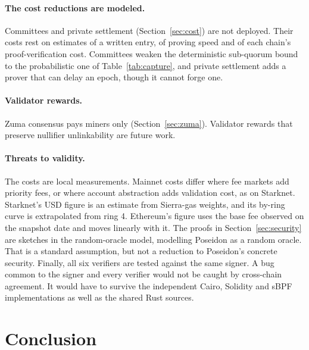 \documentclass[11pt]{article}
\theoremstyle{remark}
\begin{document}
\paragraph{The cost reductions are modeled.} Committees and private settlement (Section~\ref{sec:cost}) are not deployed. Their costs rest on estimates of a written entry, of proving speed and of each chain's proof-verification cost. Committees weaken the deterministic sub-quorum bound to the probabilistic one of Table~\ref{tab:capture}, and private settlement adds a prover that can delay an epoch, though it cannot forge one.

\paragraph{Validator rewards.} Zuma consensus pays miners only (Section~\ref{sec:zuma}). Validator rewards that preserve nullifier unlinkability are future work.

\paragraph{Threats to validity.} The costs are local measurements. Mainnet costs differ where fee markets add priority fees, or where account abstraction adds validation cost, as on Starknet. Starknet's USD figure is an estimate from Sierra-gas weights, and its by-ring curve is extrapolated from ring 4. Ethereum's figure uses the base fee observed on the snapshot date and moves linearly with it. The proofs in Section~\ref{sec:security} are sketches in the random-oracle model, modelling Poseidon as a random oracle. That is a standard assumption, but not a reduction to Poseidon's concrete security. Finally, all six verifiers are tested against the same signer. A bug common to the signer and every verifier would not be caught by cross-chain agreement. It would have to survive the independent Cairo, Solidity and sBPF implementations as well as the shared Rust sources.

\section{Conclusion}
\end{document}
